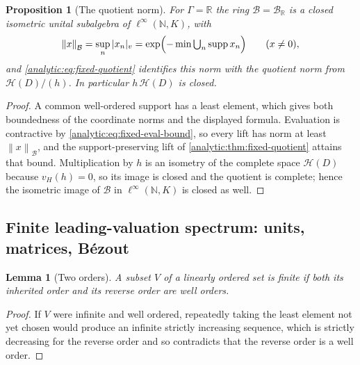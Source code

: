 \documentclass[11pt,letterpaper]{article}
\newtheorem{lemma}[theorem]{Lemma}
\newtheorem{proposition}[theorem]{Proposition}
\theoremstyle{definition}
\theoremstyle{remark}
\newcommand{\R}{\mathbb R}
\newcommand{\N}{\mathbb N}
\newcommand{\HH}{\mathcal H}
\newcommand{\BB}{\mathcal B}
\newcommand{\supp}{\operatorname{supp}}
\newcommand{\norm}[1]{\left\lVert#1\right\rVert}
\newcommand{\vH}{v_{\!H}}
\numberwithin{equation}{section}
\begin{document}
\begin{proposition}[The quotient norm]\label{analytic:prop:fixed-Bnorm}
For $\Gamma=\R$ the ring $\BB=\BB_\R$ is a closed isometric unital
subalgebra of $\ell^\infty(\N,K)$, with
\[
 \norm{x}_\BB=\sup_n|x_n|_v
 =\exp\Bigl(-\min\textstyle\bigcup_n\supp x_n\Bigr)\qquad(x\ne0),
\]
and \eqref{analytic:eq:fixed-quotient} identifies this norm with the
quotient norm from $\HH(D)/(h)$. In particular $h\,\HH(D)$ is closed.
\end{proposition}
\begin{proof}
A common well-ordered support has a least element, which gives both
boundedness of the coordinate norms and the displayed formula. Evaluation
is contractive by \eqref{analytic:eq:fixed-eval-bound}, so every lift has
norm at least $\norm x_\BB$, and the support-preserving lift of
\cref{analytic:thm:fixed-quotient} attains that bound. Multiplication by
$h$ is an isometry of the complete space $\HH(D)$ because $\vH(h)=0$, so
its image is closed and the quotient is complete; hence the isometric image
of $\BB$ in $\ell^\infty(\N,K)$ is closed as well.
\end{proof}

\subsection{Finite leading-valuation spectrum: units, matrices, B\'ezout}
\label{analytic:subsec:fixed-units}

\begin{lemma}[Two orders]\label{analytic:lem:fixed-two-orders}
A subset $V$ of a linearly ordered set is finite if both its inherited
order and its reverse order are well orders.
\end{lemma}
\begin{proof}
If $V$ were infinite and well ordered, repeatedly taking the least element
not yet chosen would produce an infinite strictly increasing sequence,
which is strictly decreasing for the reverse order and so contradicts that
the reverse order is a well order.
\end{proof}
\end{document}
